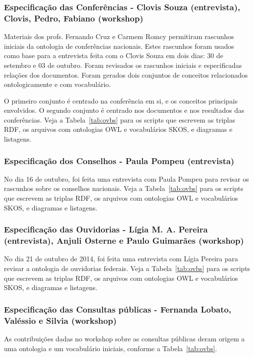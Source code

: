 \documentclass[12pt]{article}
\begin{document}
\subsubsection{Especificação das Conferências - Clovis Souza (entrevista), Clovis, Pedro, Fabiano (workshop)}
Materiais dos profs. Fernando Cruz e Carmem Romcy permitiram rascunhos iniciais da ontologia de conferências nacionais. Estes rascunhos foram usados como base para a entrevista feita com o Clovis Souza em dois dias: 30 de setembro e 03 de outubro. Foram revisados os rascunhos iniciais e especificadas relações dos documentos. Foram gerados dois conjuntos de conceitos relacionados ontologicamente e com vocabulário.

O primeiro conjunto é centrado na conferência em si, e os conceitos principais envolvidos. O segundo conjunto é centrado nos documentos e nos resultados das conferências. Veja a Tabela~\ref{tab:ovbs} para os scripts que escrevem as triplas RDF, os arquivos com ontologias OWL e vocabulários SKOS, e diagramas e listagens.

\subsubsection{Especificação dos Conselhos - Paula Pompeu (entrevista)}
No dia 16 de outubro, foi feita uma entrevista com Paula Pompeu para revisar os rascunhos sobre os conselhos nacionais.
Veja a Tabela~\ref{tab:ovbs} para os scripts que escrevem as triplas RDF, os arquivos com ontologias OWL e vocabulários SKOS, e diagramas e listagens.

\subsubsection{Especificação das Ouvidorias - Lígia M. A. Pereira (entrevista), Anjuli Osterne e Paulo Guimarães (workshop)}
No dia 21 de outubro de 2014, foi feita uma entrevista com Lígia Pereira para revisar a ontologia de ouvidorias federais.
Veja a Tabela~\ref{tab:ovbs} para os scripts que escrevem as triplas RDF, os arquivos com ontologias OWL e vocabulários SKOS, e diagramas e listagens.

\subsubsection{Especificação das Consultas públicas - Fernanda Lobato, Valéssio e Silvia (workshop)}
As contribuições dadas no workshop sobre as consultas públicas deram origem a uma ontologia e um vocabulário iniciais, conforme a Tabela~\ref{tab:ovbs}.
\end{document}
